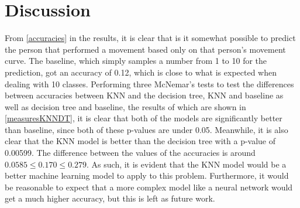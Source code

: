 \documentclass[11pt, fleqn, titlepage]{article}
\begin{document}
\section{Discussion}
From \ref{accuracies} in the results, it is clear that is it somewhat possible to predict the person that performed a movement based only on that person's movement curve. The baseline, which simply samples a number from 1 to 10 for the prediction, got an accuracy of 0.12, which is close to what is expected when dealing with 10 classes. Performing three McNemar's tests to test the differences between accuracies between KNN and the decision tree, KNN and baseline as well as decision tree and baseline, the results of which are shown in \ref{measuresKNNDT}, it is clear that both of the models are significantly better than baseline, since both of these p-values are under 0.05. Meanwhile, it is also clear that the KNN model is better than the decision tree with a p-value of 0.00599. The difference between the values of the accuracies is around $0.0585 \leq 0.170 \leq 0.279$. As such, it is evident that the KNN model would be a better machine learning model to apply to this problem. Furthermore, it would be reasonable to expect that a more complex model like a neural network would get a much higher accuracy, but this is left as future work.
\end{document}
